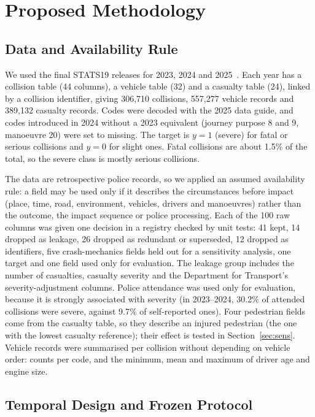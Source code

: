 \documentclass[conference,letterpaper]{IEEEtran}
\begin{document}
\section{Proposed Methodology}

\subsection{Data and Availability Rule}

We used the final STATS19 releases for 2023, 2024 and 2025~\cite{dft2026stats19}. Each year has a collision table (44 columns), a vehicle table (32) and a casualty table (24), linked by a collision identifier, giving 306,710 collisions, 557,277 vehicle records and 389,132 casualty records. Codes were decoded with the 2025 data guide, and codes introduced in 2024 without a 2023 equivalent (journey purpose 8 and 9, manoeuvre 20) were set to missing. The target is $y=1$ (severe) for fatal or serious collisions and $y=0$ for slight ones. Fatal collisions are about 1.5\% of the total, so the severe class is mostly serious collisions.

The data are retrospective police records, so we applied an assumed availability rule: a field may be used only if it describes the circumstances before impact (place, time, road, environment, vehicles, drivers and manoeuvres) rather than the outcome, the impact sequence or police processing. Each of the 100 raw columns was given one decision in a registry checked by unit tests: 41 kept, 14 dropped as leakage, 26 dropped as redundant or superseded, 12 dropped as identifiers, five crash-mechanics fields held out for a sensitivity analysis, one target and one field used only for evaluation. The leakage group includes the number of casualties, casualty severity and the Department for Transport's severity-adjustment columns. Police attendance was used only for evaluation, because it is strongly associated with severity (in 2023--2024, 30.2\% of attended collisions were severe, against 9.7\% of self-reported ones). Four pedestrian fields come from the casualty table, so they describe an injured pedestrian (the one with the lowest casualty reference); their effect is tested in Section~\ref{sec:sens}. Vehicle records were summarised per collision without depending on vehicle order: counts per code, and the minimum, mean and maximum of driver age and engine size.

\subsection{Temporal Design and Frozen Protocol}
\end{document}
